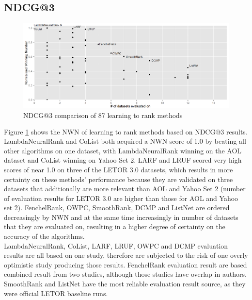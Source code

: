 \documentclass[english, authoryear, preprint]{elsarticle}
\begin{document}
\subsection{NDCG@3}
\begin{figure}
\centering
\includegraphics[scale=0.26]{gfx/ndcg3_winnum}
\caption{NDCG@3 comparison of 87 learning to rank methods}
\label{fig:normalized_winning_number_ndcg3}
\end{figure}
Figure \ref{fig:normalized_winning_number_ndcg3} shows the NWN of learning to rank methods based on NDCG@3 results. LambdaNeuralRank and CoList both acquired a NWN score of 1.0 by beating all other algorithms on one dataset, with LambdaNeuralRank winning on the AOL dataset and CoList winning on Yahoo Set 2. LARF and LRUF scored very high scores of near 1.0 on three of the LETOR 3.0 datasets, which results in more certainty on these methods' performance because they are validated on three datasets that additionally are more relevant than AOL and Yahoo Set 2 (number of evaluation results for LETOR 3.0 are higher than those for AOL and Yahoo set 2). FenchelRank, OWPC, SmoothRank, DCMP and ListNet are ordered decreasingly by NWN and at the same time increasingly in number of datasets that they are evaluated on, resulting in a higher degree of certainty on the accuracy of the algorithms.\\

LambdaNeuralRank, CoList, LARF, LRUF, OWPC and DCMP evaluation results are all based on one study, therefore are subjected to the risk of one overly optimistic study producing those results. FenchelRank evaluation result are based combined result from two studies, although those studies have overlap in authors. SmoothRank and ListNet have the most reliable evaluation result source, as they were official LETOR baseline runs.  
\end{document}
